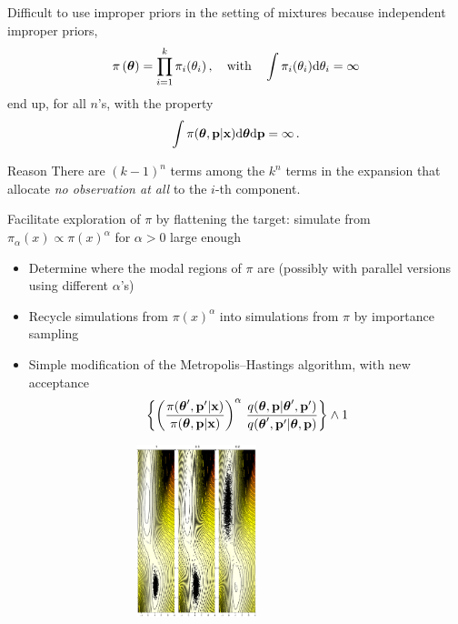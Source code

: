 \begin{slide}
Difficult to use improper priors in the setting of mixtures because independent improper priors,
$$
\pi\left(\mbox{\boldmath{$\theta$}}\right)=\prod_{i=1}^k\pi_i(\theta_i)\,,
\quad\text{with}\quad
\int\pi_i(\theta_i)\hbox{d}\theta_i=\infty
$$
end up, for all $n$'s, with the property
$$\int\pi(\mbox{\boldmath{$\theta$}},\mathbf{p}|\mathbf{x})
\hbox{d}\mbox{\boldmath{$\theta$}}\hbox{d}\mathbf{p}=\infty\,.
$$ 

\pause
\begin{block}{Reason}
There are $(k-1)^n$ terms among the $k^n$ terms in the expansion that allocate {\em no
observation at all} to the  $i$-th component.
\end{block}

\end{slide}\begin{slide}

Facilitate exploration of $\pi$ by flattening the target: simulate from $\pi_\alpha(x)\propto 
\pi(x)^\alpha$ for $\alpha>0$ large enough 

\vs\pause\begin{itemize}
\item Determine where the modal regions of $\pi$ are (possibly with parallel versions using
different $\alpha$'s)
\item Recycle simulations from $\pi(x)^\alpha$ into simulations from $\pi$ by importance sampling
\item Simple modification of the Metropolis--Hastings algorithm, with new acceptance
$$
\left\{ \left(\frac{\pi(\mbox{\boldmath{$\theta$}}^\prime,\mathbf{p}^\prime|\mathbf{x})} {\pi(\mbox{\boldmath{$\theta$}},\mathbf{p}|\mathbf{x})}\right)^\alpha\,
\frac{q(\mbox{\boldmath{$\theta$}},\mathbf{p}|\mbox{\boldmath{$\theta$}}^\prime,\mathbf{p}^\prime)} {q(\mbox{\boldmath{$\theta$}}^\prime,\mathbf{p}^\prime|\mbox{\boldmath{$\theta$}},\mathbf{p})}\right\} \wedge 1
$$
\end{itemize}

\end{slide}\begin{slide}

\includegraphics[width=11cm,height=5cm]{figures/tempix.eps}


\end{slide}
